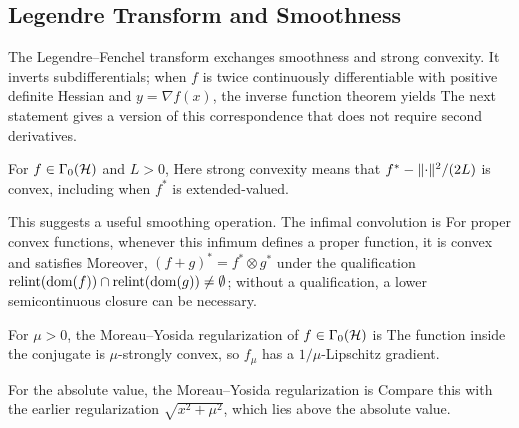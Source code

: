 \subsection{Legendre Transform and Smoothness}

The Legendre--Fenchel transform exchanges smoothness and strong convexity. It inverts subdifferentials; when $f$ is twice continuously differentiable with positive definite Hessian and $y=\nabla f(x)$, the inverse function theorem yields
The next statement gives a version of this correspondence that does not require second derivatives.

\begin{prop}\label{prop-conjugate-smoothness}
For $f\in\Gamma_0(\mathcal{H})$ and $L>0$,
Here strong convexity means that $f^*-\lVert\cdot\rVert^2/(2L)$ is convex, including when $f^*$ is extended-valued.
\end{prop}

This suggests a useful smoothing operation. The infimal convolution is
For proper convex functions, whenever this infimum defines a proper function, it is convex and satisfies
Moreover, $(f+g)^*=f^*\otimes g^*$ under the qualification $\operatorname{relint}(\operatorname{dom}(f))\cap\operatorname{relint}(\operatorname{dom}(g))\neq\emptyset$; without a qualification, a lower semicontinuous closure can be necessary.

For $\mu>0$, the Moreau--Yosida regularization of $f\in\Gamma_0(\mathcal{H})$ is
The function inside the conjugate is $\mu$-strongly convex, so $f_\mu$ has a $1/\mu$-Lipschitz gradient.

For the absolute value, the Moreau--Yosida regularization is
Compare this with the earlier regularization $\sqrt{x^2+\mu^2}$, which lies above the absolute value.




